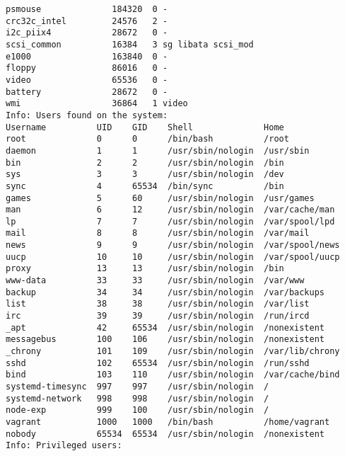 \begin{longlisting}
\begin{verbatim}
psmouse              184320  0 -
crc32c_intel         24576   2 -
i2c_piix4            28672   0 -
scsi_common          16384   3 sg libata scsi_mod
e1000                163840  0 -
floppy               86016   0 -
video                65536   0 -
battery              28672   0 -
wmi                  36864   1 video
Info: Users found on the system:
Username          UID    GID    Shell              Home
root              0      0      /bin/bash          /root
daemon            1      1      /usr/sbin/nologin  /usr/sbin
bin               2      2      /usr/sbin/nologin  /bin
sys               3      3      /usr/sbin/nologin  /dev
sync              4      65534  /bin/sync          /bin
games             5      60     /usr/sbin/nologin  /usr/games
man               6      12     /usr/sbin/nologin  /var/cache/man
lp                7      7      /usr/sbin/nologin  /var/spool/lpd
mail              8      8      /usr/sbin/nologin  /var/mail
news              9      9      /usr/sbin/nologin  /var/spool/news
uucp              10     10     /usr/sbin/nologin  /var/spool/uucp
proxy             13     13     /usr/sbin/nologin  /bin
www-data          33     33     /usr/sbin/nologin  /var/www
backup            34     34     /usr/sbin/nologin  /var/backups
list              38     38     /usr/sbin/nologin  /var/list
irc               39     39     /usr/sbin/nologin  /run/ircd
_apt              42     65534  /usr/sbin/nologin  /nonexistent
messagebus        100    106    /usr/sbin/nologin  /nonexistent
_chrony           101    109    /usr/sbin/nologin  /var/lib/chrony
sshd              102    65534  /usr/sbin/nologin  /run/sshd
bind              103    110    /usr/sbin/nologin  /var/cache/bind
systemd-timesync  997    997    /usr/sbin/nologin  /
systemd-network   998    998    /usr/sbin/nologin  /
node-exp          999    100    /usr/sbin/nologin  /
vagrant           1000   1000   /bin/bash          /home/vagrant
nobody            65534  65534  /usr/sbin/nologin  /nonexistent
Info: Privileged users:


\end{verbatim}
\end{longlisting}
